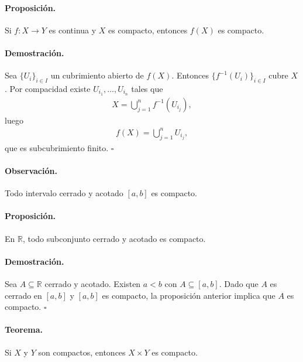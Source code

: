 \paragraph{\textbf{Proposición.}}
Si $f\colon X\to Y$ es continua y $X$ es compacto, entonces $f(X)$ es compacto.

\paragraph{\textbf{Demostración.}}
Sea $\{U_i\}_{i\in I}$ un cubrimiento abierto de $f(X)$.  
Entonces $\bigl\{f^{-1}(U_i)\bigr\}_{i\in I}$ cubre $X$.  
Por compacidad existe $U_{i_1},\dots,U_{i_n}$ tales que
\begin{align*}
X=\bigcup_{j=1}^{n}f^{-1}(U_{i_j}),
\end{align*}
luego
\begin{align*}
f(X)=\bigcup_{j=1}^{n}U_{i_j},
\end{align*}
que es subcubrimiento finito. \hfill$\square$

\paragraph{\textbf{Observación.}}
Todo intervalo cerrado y acotado $[a,b]$ es compacto.

\paragraph{\textbf{Proposición.}}
En $\mathbb R$, todo subconjunto cerrado y acotado es compacto.

\paragraph{\textbf{Demostración.}}
Sea $A\subseteq\mathbb R$ cerrado y acotado.  
Existen $a<b$ con $A\subseteq[a,b]$.  
Dado que $A$ es cerrado en $[a,b]$ y $[a,b]$ es compacto, la proposición anterior implica que $A$ es compacto. \hfill$\square$

\paragraph{\textbf{Teorema.}}
Si $X$ y $Y$ son compactos, entonces $X\times Y$ es compacto.

